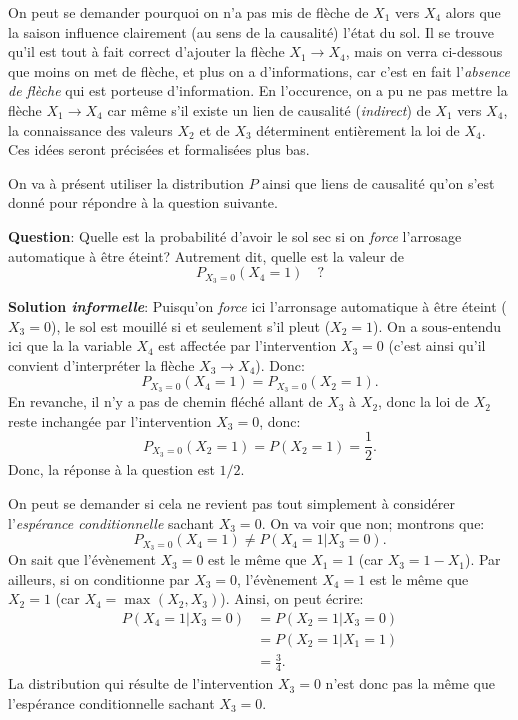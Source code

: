 On peut se demander pourquoi on n'a pas mis de flèche de \(X_1\) vers
\(X_4\) alors que la saison influence clairement (au sens de la
causalité) l'état du sol. Il se trouve qu'il est tout à fait correct
d'ajouter la flèche \(X_1\to X_4\), mais on verra ci-dessous que moins on
met de flèche, et plus on a d'informations, car c'est en fait
l'\emph{absence de flèche} qui est porteuse d'information. En l'occurence, on
a pu ne pas mettre la flèche \(X_1\to X_4\) car même s'il existe
un lien de causalité (\emph{indirect}) de \(X_1\) vers \(X_4\), la connaissance
des valeurs \(X_2\) et de \(X_3\) déterminent entièrement la loi de
\(X_4\). Ces idées seront précisées et formalisées plus bas.

On va à présent utiliser la distribution \(P\) ainsi que liens de
causalité qu'on s'est donné pour répondre à la question suivante.

\textbf{Question}: Quelle est la probabilité d'avoir le sol sec si on \emph{force}
 l'arrosage automatique à être éteint? Autrement dit, quelle est la
 valeur de
 \[ P_{X_3=0}(X_4=1)\quad ? \]

\textbf{Solution \emph{informelle}}: Puisqu'on \emph{force} ici l'arronsage
 automatique à être éteint (\(X_3=0\)), le sol est mouillé si et
 seulement s'il pleut (\(X_2=1\)). On a sous-entendu ici que la
 la variable \(X_4\) est affectée par l'intervention \(X_3=0\) (c'est
 ainsi qu'il convient d'interpréter la flèche \(X_3\to X_4\)). Donc: 
 \[ P_{X_3=0}(X_4=1)=P_{X_3=0}(X_2=1). \]
 En revanche, il n'y a pas de chemin fléché allant de \(X_3\) à \(X_2\),
 donc la loi de \(X_2\) reste inchangée par l'intervention \(X_3=0\), donc:
 \[ P_{X_3=0}(X_2=1)=P(X_2=1)=\frac{1}{2}. \]
 Donc, la réponse à la question est \(1/2\).

On peut se demander si cela ne revient pas tout simplement à
considérer l'\emph{espérance conditionnelle} sachant $X_3=0$. On va voir que non; montrons que:
\[ P_{X_3=0}(X_4=1)\neq P(X_4=1|X_3=0). \]
On sait que l'évènement \(X_3=0\) est
le même que \(X_1=1\) (car \(X_3=1-X_1\)).
Par ailleurs, si on conditionne par \(X_3=0\), l'évènement \(X_4=1\) est
le même que \(X_2=1\) (car \(X_4=\max_{}(X_2,X_3)\)).
Ainsi, on peut écrire:
\begin{align*}
P(X_4=1|X_3=0)&=P(X_2=1|X_3=0)\\
&=P(X_2=1|X_1=1)\\
&=\frac{3}{4}.
\end{align*}
La distribution qui résulte de l'intervention $X_3=0$ n'est donc pas
la même que l'espérance conditionnelle sachant $X_3=0$.

